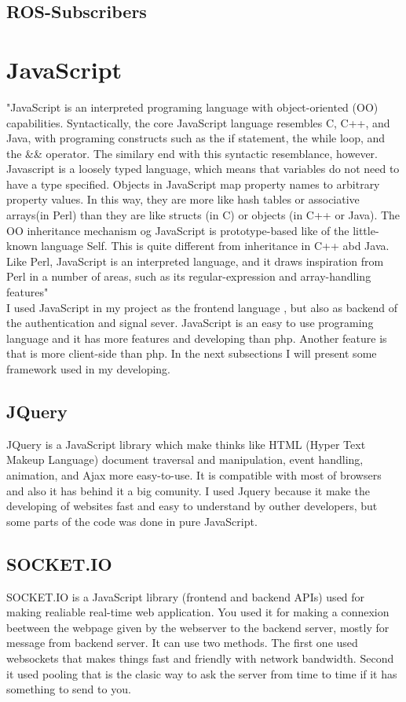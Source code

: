 \subsection{ROS-Subscribers}
\label{sub-sec:ros-subscribers}


\section{JavaScript}
\label{sec:javascript}
"JavaScript is an interpreted programing language with object-oriented (OO)
capabilities. Syntactically, the core JavaScript language resembles C, C++,
and Java, with programing constructs such as the if statement, the while loop,
and the \&\& operator. The similary end with this syntactic resemblance, however.
Javascript is a loosely typed language, which means that variables do not need
to have a type specified. Objects in JavaScript map property names to arbitrary property
values. In this way, they are more like hash tables or associative arrays(in Perl) than
they are like structs (in C) or objects (in C++ or Java). The OO inheritance mechanism
og JavaScript is prototype-based like of the little-known language Self. This is quite
different from inheritance in C++ abd Java. Like Perl, JavaScript is an interpreted
language, and it draws inspiration from Perl in a number of areas, such as its regular-expression
and array-handling features" \cite{flanagan2006javascript} \\
I used JavaScript in my project as the frontend language , but also as backend of the authentication and
signal sever. JavaScript is an easy to use programing language and it has more features and developing
than php. Another feature is that is more client-side than php. In the next subsections I will present
some framework used in my developing.


\subsection{JQuery}
\label{sub-sec:javascript-jquery}
JQuery is a JavaScript library which make thinks like HTML (Hyper Text Makeup Language)
document traversal and manipulation, event handling, animation, and Ajax more easy-to-use.
It is compatible with most of browsers and also it has behind it a big comunity. I used
Jquery because it make the developing of websites fast and easy to understand by outher
developers, but some parts of the code was done in pure JavaScript.


\subsection{SOCKET.IO}
\label{sub-sec:javascript-socket}
SOCKET.IO is a JavaScript library (frontend and backend APIs) used for making
realiable real-time web application. You used it for making a connexion beetween
the webpage given by the webserver to the backend server, mostly for message from
backend server. It can use two methods. The first one used websockets that makes
things fast and friendly with network bandwidth. Second it used pooling that is the
clasic way to ask the server from time to time if it has something to send to you.
